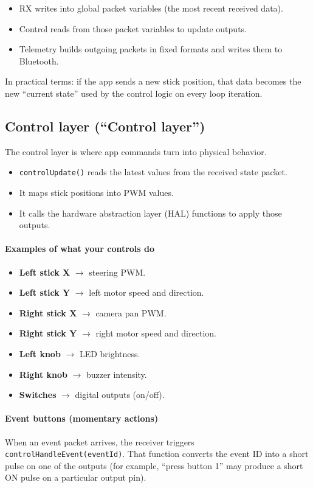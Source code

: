 \documentclass[a3paper,11pt]{article}
\begin{document}
\begin{itemize}
	\item RX writes into global packet variables (the most recent received data).
	\item Control reads from those packet variables to update outputs.
	\item Telemetry builds outgoing packets in fixed formats and writes them to Bluetooth.
\end{itemize}

In practical terms: if the app sends a new stick position, that data becomes the new ``current state'' used by
the control logic on every loop iteration.

\subsection{Control layer (``Control layer'')}
The control layer is where app commands turn into physical behavior.

\begin{itemize}
	\item \texttt{controlUpdate()} reads the latest values from the received state packet.
	\item It maps stick positions into PWM values.
	\item It calls the hardware abstraction layer (HAL) functions to apply those outputs.
\end{itemize}

\paragraph{Examples of what your controls do}
\begin{itemize}
	\item \textbf{Left stick X} $\rightarrow$ steering PWM.
	\item \textbf{Left stick Y} $\rightarrow$ left motor speed and direction.
	\item \textbf{Right stick X} $\rightarrow$ camera pan PWM.
	\item \textbf{Right stick Y} $\rightarrow$ right motor speed and direction.
	\item \textbf{Left knob} $\rightarrow$ LED brightness.
	\item \textbf{Right knob} $\rightarrow$ buzzer intensity.
	\item \textbf{Switches} $\rightarrow$ digital outputs (on/off).
\end{itemize}

\paragraph{Event buttons (momentary actions)}
When an event packet arrives, the receiver triggers \texttt{controlHandleEvent(eventId)}.
That function converts the event ID into a short pulse on one of the outputs (for example, ``press button 1''
may produce a short ON pulse on a particular output pin).
\end{document}
